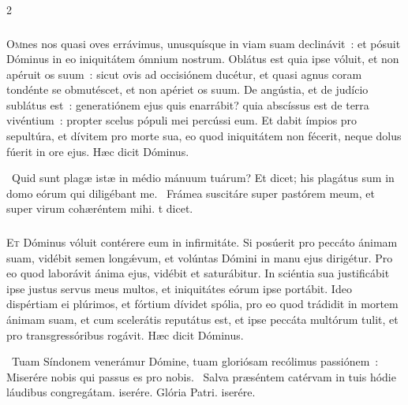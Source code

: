 \documentclass[9pt,twoside]{extarticle}
\begin{document}
\begin{multicols}{2}
\subsubsection*{\center {}}
\lettrine{O}mnes nos quasi oves errávimus, unusquísque in viam suam declinávit~: et pósuit Dóminus in eo iniquitátem ómnium nostrum.
Oblátus est quia ipse vóluit, et non apéruit os suum~: sicut ovis ad occisiónem ducétur, et quasi agnus coram tondénte se obmutéscet, et non apériet os suum.
De angústia, et de judício sublátus est~: generatiónem ejus quis enarrábit? quia abscíssus est de terra vivéntium~: propter scelus pópuli mei percússi eum.
Et dabit ímpios pro sepultúra, et dívitem pro morte sua, eo quod iniquitátem non fécerit, neque dolus fúerit in ore ejus. Hæc dicit Dóminus.

\begin{tightlist}{}
\item {}~Quid sunt plagæ istæ in médio mánuum tuárum? \textred{*} Et dicet; his plagátus sum in domo eórum qui diligébant me. ~Frámea suscitáre super pastórem meum, et super virum cohæréntem mihi. t dicet.
\end{tightlist}

\subsubsection*{\center {}}
\lettrine{E}t Dóminus vóluit contérere eum in infirmitáte. Si posúerit pro peccáto ánimam suam, vidébit semen longǽvum, et volúntas Dómini in manu ejus dirigétur.
Pro eo quod laborávit ánima ejus, vidébit et saturábitur. In sciéntia sua justificábit ipse justus servus meus multos, et iniquitátes eórum ipse portábit.
Ideo dispértiam ei plúrimos, et fórtium dívidet spólia, pro eo quod trádidit in mortem ánimam suam, et cum scelerátis reputátus est, et ipse peccáta multórum tulit, et pro transgressóribus rogávit. Hæc dicit Dóminus.

\begin{tightlist}{}
\item {}~Tuam Síndonem venerámur Dómine, tuam gloriósam recólimus passiónem~: \textred{*} Miserére nobis qui passus es pro nobis. ~Salva præséntem catérvam in tuis hódie láudibus congregátam. iserére. Glória Patri. iserére.
\end{tightlist}


\end{multicols}
\end{document}
